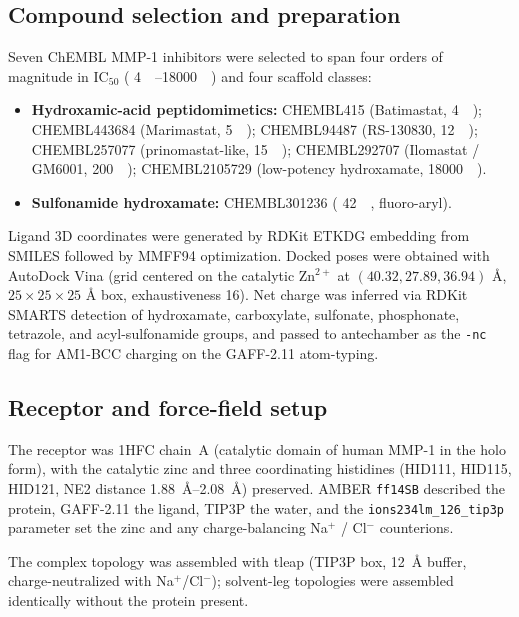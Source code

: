 \documentclass[11pt,a4paper]{article}
\begin{document}
\subsection{Compound selection and preparation}
\label{sec:methods-compounds}

Seven ChEMBL MMP-1 inhibitors were selected to span four orders of
magnitude in IC$_{50}$ ( \SIrange{4}{18000}{\nano\Molar}) and
four scaffold classes:

\begin{itemize}[leftmargin=*]
  \item \textbf{Hydroxamic-acid peptidomimetics:} CHEMBL415 (Batimastat,
     \SI{4}{\nano\Molar}); CHEMBL443684 (Marimastat,
     \SI{5}{\nano\Molar}); CHEMBL94487 (RS-130830,
     \SI{12}{\nano\Molar}); CHEMBL257077 (prinomastat-like,
     \SI{15}{\nano\Molar}); CHEMBL292707 (Ilomastat / GM6001,
     \SI{200}{\nano\Molar}); CHEMBL2105729 (low-potency
    hydroxamate,  \SI{18000}{\nano\Molar}).
  \item \textbf{Sulfonamide hydroxamate:} CHEMBL301236
    ( \SI{42}{\nano\Molar}, fluoro-aryl).
\end{itemize}

Ligand 3D coordinates were generated by RDKit ETKDG embedding from SMILES
followed by MMFF94 optimization. Docked poses were obtained with
AutoDock Vina (grid centered on the catalytic Zn$^{2+}$ at
$(40.32, 27.89, 36.94)$ \unit{\angstrom}, $25 \times 25 \times 25$
\unit{\angstrom} box, exhaustiveness 16). Net charge was inferred via
RDKit SMARTS detection of hydroxamate, carboxylate, sulfonate,
phosphonate, tetrazole, and acyl-sulfonamide groups, and passed to
antechamber as the \texttt{-nc} flag for AM1-BCC charging on the
GAFF-2.11 atom-typing.

\subsection{Receptor and force-field setup}

The receptor was 1HFC chain~A (catalytic domain of human MMP-1 in the
holo form), with the catalytic zinc and three coordinating histidines
(HID111, HID115, HID121, NE2 distance \SIrange{1.88}{2.08}{\angstrom})
preserved. AMBER \texttt{ff14SB} described the protein, GAFF-2.11 the
ligand, TIP3P the water, and the
\texttt{ions234lm\_126\_tip3p} parameter set the zinc and any
charge-balancing Na$^+$ / Cl$^-$ counterions.

The complex topology was assembled with tleap (TIP3P box,
\SI{12}{\angstrom} buffer, charge-neutralized with Na$^+$/Cl$^-$);
solvent-leg topologies were assembled identically without the protein
present.
\end{document}
